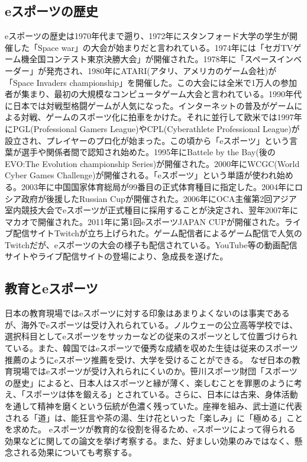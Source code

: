 \subsection{eスポーツの歴史}
eスポーツの歴史は1970年代まで遡り、1972年にスタンフォード大学の学生が開催した「Space war」の大会が始まりだと言われている。1974年には「セガTVゲーム機全国コンテスト東京決勝大会」が開催された。1978年に「スペースインベーダー」が発売され、1980年にATARI(アタリ、アメリカのゲーム会社)が「Space Invaders championship」を開催した。この大会には全米で1万人の参加者が集まり、最初の大規模なコンピュータゲーム大会と言われている。1990年代に日本では対戦型格闘ゲームが人気になった。インターネットの普及がゲームによる対戦、ゲームのスポーツ化に拍車をかけた。それに並行して欧米では1997年にPGL(Professional Gamers League)やCPL(Cyberathlete Professional League)が設立され、プレイヤーのプロ化が始まった。この頃から「eスポーツ」という言葉が選手や関係者間で認知され始めた。1995年にBattele by the Bay(後のEVO:The Evolution championship Series)が開催された。2000年にWCGC(World Cyber Games Challenge)が開催される。「eスポーツ」という単語が使われ始める。2003年に中国国家体育総局が99番目の正式体育種目に指定した。2004年にロシア政府が後援したRussian Cupが開催された。2006年にOCA主催第2回アジア室内競技大会でeスポーツが正式種目に採用することが決定され、翌年2007年にマカオで開催された。2011年に第1回eスポーツJAPAN CUPが開催された。ライブ配信サイトTwitchが立ち上げられた。ゲーム配信者によるゲーム配信で人気のTwitchだが、eスポーツの大会の様子も配信されている。YouTube等の動画配信サイトやライブ配信サイトの登場により、急成長を遂げた。


\subsection{教育とeスポーツ}
日本の教育現場ではeスポーツに対する印象はあまりよくないのは事実であるが、海外でeスポーツは受け入れられている。ノルウェーの公立高等学校では、選択科目としてeスポーツをサッカーなどの従来のスポーツとして位置づけられている。また、韓国ではeスポーツで優秀な成績を収めた生徒は従来のスポーツ推薦のようにeスポーツ推薦を受け、大学を受けることができる。
なぜ日本の教育現場ではeスポーツが受け入れられにくいのか。笹川スポーツ財団「スポーツの歴史」によると、日本人はスポーツと縁が薄く、楽しむことを罪悪のように考え、「スポーツは体を鍛える」とされている。さらに、日本には古来、身体活動を通して精神を磨くという伝統が色濃く残っていた。座禅を組み、武士道に代表される「道」は、能狂言や茶の湯、生け花といった「楽しみ」に「極める」ことを求めた。
eスポーツが教育的な役割を得るため、eスポーツによって得られる効果などに関しての論文を挙げ考察する。また、好ましい効果のみではなく、懸念される効果についても考察する。

